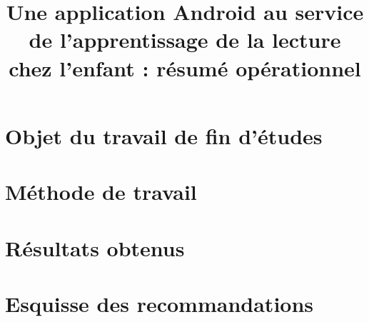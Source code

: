 \documentclass[11pt]{article}
\title{
\vspace{-2cm}
\parbox{15cm}
{	\vspace{0.5cm}
	\begin{center}\sf\bfseries
		Une application Android au service de l'apprentissage de la lecture chez l'enfant : résumé opérationnel
	\end{center}
	\vspace{-2cm}
}}
\begin{document}
\date{}
\maketitle
\thispagestyle{fancy}
\section{Objet du travail de fin d'études}
\section{Méthode de travail}
\section{Résultats obtenus}
\section{Esquisse des recommandations}
\end{document}
